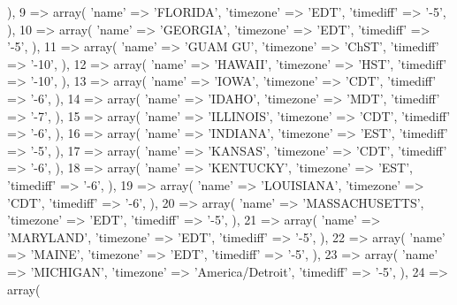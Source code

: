 {{{{{{                ),
                9 => array(
                    'name' => 'FLORIDA',
                    'timezone' => 'EDT',
                    'timediff' => '-5',
                ),
                10 => array(
                    'name' => 'GEORGIA',
                    'timezone' => 'EDT',
                    'timediff' => '-5',
                ),
                11 => array(
                    'name' => 'GUAM GU',
                    'timezone' => 'ChST',
                    'timediff' => '-10',
                ),
                12 => array(
                    'name' => 'HAWAII',
                    'timezone' => 'HST',
                    'timediff' => '-10',
                ),
                13 => array(
                    'name' => 'IOWA',
                    'timezone' => 'CDT',
                    'timediff' => '-6',
                ),
                14 => array(
                    'name' => 'IDAHO',
                    'timezone' => 'MDT',
                    'timediff' => '-7',
                ),
                15 => array(
                    'name' => 'ILLINOIS',
                    'timezone' => 'CDT',
                    'timediff' => '-6',
                ),
                16 => array(
                    'name' => 'INDIANA',
                    'timezone' => 'EST',
                    'timediff' => '-5',
                ),
                17 => array(
                    'name' => 'KANSAS',
                    'timezone' => 'CDT',
                    'timediff' => '-6',
                ),
                18 => array(
                    'name' => 'KENTUCKY',
                    'timezone' => 'EST',
                    'timediff' => '-6',
                ),
                19 => array(
                    'name' => 'LOUISIANA',
                    'timezone' => 'CDT',
                    'timediff' => '-6',
                ),
                20 => array(
                    'name' => 'MASSACHUSETTS',
                    'timezone' => 'EDT',
                    'timediff' => '-5',
                ),
                21 => array(
                    'name' => 'MARYLAND',
                    'timezone' => 'EDT',
                    'timediff' => '-5',
                ),
                22 => array(
                    'name' => 'MAINE',
                    'timezone' => 'EDT',
                    'timediff' => '-5',
                ),
                23 => array(
                    'name' => 'MICHIGAN',
                    'timezone' => 'America/Detroit',
                    'timediff' => '-5',
                ),
                24 => array(
}}}}}}
